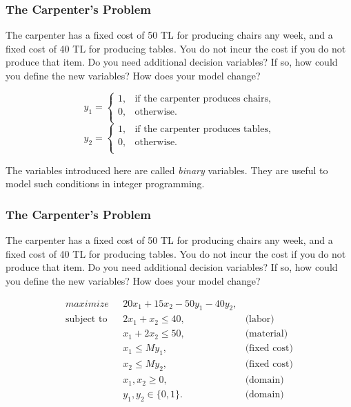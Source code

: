 \documentclass[11pt]{beamer}
\begin{document}
\begin{frame}
\frametitle{The Carpenter's Problem}
The carpenter has a fixed cost of 50 TL for producing chairs any week, and a fixed cost of 40 TL for producing tables. You do not incur the cost if you do not produce that item.
Do you need additional decision variables? If so, how could you define the new variables?
How does your model change?

\pause
\begin{equation}\nonumber
    y_{1} =
    \begin{cases}
      1, & \text{if the carpenter produces chairs,} \\
      0, & \text{otherwise.} \\
    \end{cases}
  \end{equation}\begin{equation}\nonumber
    y_{2} =
    \begin{cases}
      1, & \text{if the carpenter produces tables,} \\
      0, & \text{otherwise.} \\
    \end{cases}
  \end{equation}

The variables introduced here are called \textit{binary} variables. They are useful to model such conditions in integer programming.
  
\end{frame}

\begin{frame}
\frametitle{The Carpenter's Problem}
The carpenter has a fixed cost of 50 TL for producing chairs any week, and a fixed cost of 40 TL for producing tables. You do not incur the cost if you do not produce that item.
Do you need additional decision variables? If so, how could you define the new variables?
How does your model change?

\pause
  
\begin{align}
\displaystyle maximize \mbox{ } & 20x_1 + 15x_2 - 50 y_1 - 40 y_2, \label{carpenter3:objective} \\
% 
\mbox{subject to }&2 x_1 + x_2  \leq 40, & \mbox{(labor)}  \label{carpenter3:labor}\\
&x_1 + 2 x_2  \leq 50, & \mbox{(material)}  \label{carpenter3:material}\\
& x_1 \leq M y_1, & \mbox{(fixed cost)}  \label{carpenter3:fixed1}\\
& x_2 \leq M y_2, & \mbox{(fixed cost)}  \label{carpenter3:fixed2}\\
& x_1, x_2 \geq 0, & \mbox{(domain)} \label{carpenter3:domain}\\
& y_1, y_2 \in \{0,1\}. & \mbox{(domain)} \label{carpenter3:domain2}
\end{align}
  
\end{frame}
\end{document}
